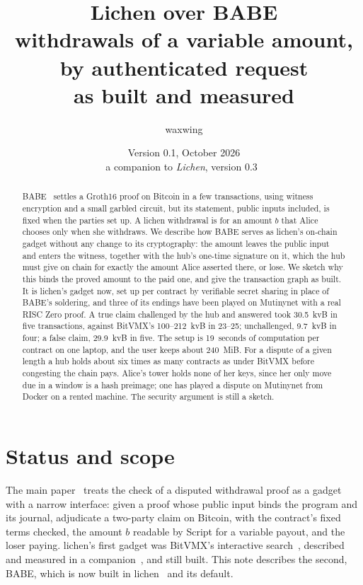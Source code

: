 \documentclass[11pt]{article}
\title{\textbf{Lichen over BABE}\\withdrawals of a variable amount, by authenticated request\\[2pt]\large as built and measured}
\author{waxwing}
\date{Version 0.1, October 2026\\[2pt]\small a companion to \emph{Lichen}, version 0.3~\cite{lichen}}
\begin{document}
\maketitle

\begin{abstract}
BABE~\cite{babe} settles a Groth16 proof on Bitcoin in a few
transactions, using witness encryption and a small garbled circuit, but
its statement, public inputs included, is fixed when the parties set up.
A lichen withdrawal is for an amount $b$ that Alice chooses only when she
withdraws. We describe how BABE serves as lichen's on-chain gadget
without any change to its cryptography: the amount leaves the public
input and enters the witness, together with the hub's one-time signature
on it, which the hub must give on chain for exactly the amount Alice
asserted there, or lose. We sketch why this binds the proved amount to
the paid one, and give the transaction graph as built. It is lichen's
gadget now, set up per contract by verifiable secret sharing in place of
BABE's soldering, and three of its endings have been played on
Mutinynet with a real RISC Zero proof. A true claim challenged by the
hub and answered took 30.5~kvB in five transactions, against BitVMX's
100--212~kvB in 23--25; unchallenged, 9.7~kvB in four; a false claim,
29.9~kvB in five. The setup is 19~seconds of computation per contract on
one laptop, and the user keeps about 240~MiB. For a dispute of a given
length a hub holds about six times as many contracts as under BitVMX
before congesting the chain pays. Alice's tower holds none of her keys,
since her only move due in a window is a hash preimage; one has played a
dispute on Mutinynet from Docker on a rented machine. The security
argument is still a sketch.
\end{abstract}

\tableofcontents

\section{Status and scope}
\label{sec:status}

The main paper~\cite{lichen} treats the check of a disputed withdrawal
proof as a gadget with a narrow interface: given a proof whose public
input binds the program and its journal, adjudicate a two-party claim
on Bitcoin, with the contract's fixed terms checked, the amount $b$
readable by Script for a variable payout, and the loser paying. lichen's
first gadget was BitVMX's interactive search~\cite{bitvmx}, described and
measured in a companion~\cite{lichenbitvmx}, and still built. This note
describes the second, BABE, which is now built in lichen~\cite{lichencode}
and its default.
\end{document}
